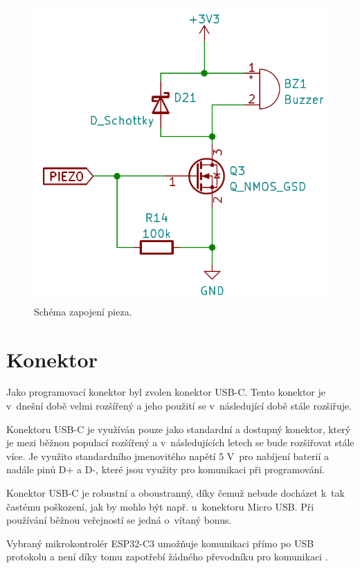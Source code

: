 \begin{figure}[!h]
  \begin{center}
    \includegraphics[scale=0.45]{obrazky/piezo.png}
  \end{center}
  \caption[Schéma zapojení pieza]{Schéma zapojení pieza.}
\end{figure}

\section{Konektor}
Jako programovací konektor byl zvolen konektor USB-C. Tento konektor je v~dnešní době velmi rozšířený a jeho použití se v~následující době stále rozšiřuje. 

Konektoru USB-C je využíván pouze jako standardní a dostupný konektor, který je mezi běžnou
populací rozšířený a v~následujících letech se bude rozšiřovat stále více. Je využito standardního jmenovitého napětí 5 V~pro nabíjení baterií a nadále pinů D+ a D-, 
které jsou využity pro komunikaci při programování. 

Konektor USB-C je robustní a oboustranný, díky čemuž nebude docházet k~tak častému poškození, jak by mohlo být např. u~konektoru Micro USB. Při používání běžnou veřejností
se jedná o~vítaný bonus. 

Vybraný mikrokontrolér ESP32-C3 umožňuje komunikaci přímo po USB protokolu a není díky tomu zapotřebí žádného převodníku pro komunikaci \cite{ESP_C3_dtsh}.

